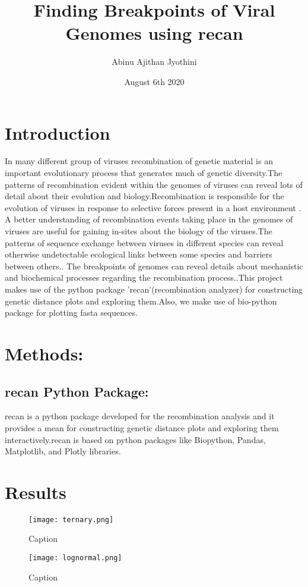 \documentclass{article}
\title{Finding Breakpoints of Viral Genomes using recan}
\author{Abinu Ajithan Jyothini}
\date{August 6th 2020}
\begin{document}
\maketitle
\section{Introduction}
In many different group of viruses recombination of genetic material is an important evolutionary process that generates much of genetic diversity.The patterns of recombination evident within the genomes of viruses can reveal lots of detail about their evolution and biology.Recombination is responsible for the evolution of viruses in response to selective forces present in a host environment \cite{perez2015recombination}. A better understanding of recombination events taking place in the genomes of viruses are useful for gaining in-sites about the biology of the viruses.The patterns of sequence exchange between viruses in different species can reveal otherwise undetectable ecological links between some species and barriers between others.\cite{martin2015rdp4}. The breakpoints of genomes can reveal details about mechanistic and biochemical processes regarding the recombination process.\cite{martin2015rdp4}.This project makes use of the python package 'recan'\cite{babin2020recan}(recombination analyzer) for constructing genetic distance plots and exploring them.Also, we make use of bio-python\cite{chapman2000biopython} package for plotting fasta sequences.
\section{Methods:}
\subsection{recan Python Package:}
recan is a python package developed for the recombination analysis and it provides a mean for constructing genetic distance plots and exploring them interactively.recan is based on python packages like Biopython, Pandas, Matplotlib, and Plotly libraries.
\section{Results}
\begin{figure}
    \centering
    \texttt{[image: ternary.png]}
    \caption{Caption}
    \label{ternary}
\end{figure}

\begin{figure}
    \centering
    \texttt{[image: lognormal.png]}
    \caption{Caption}
    \label{ternary}
\end{figure}



 

\end{document}
